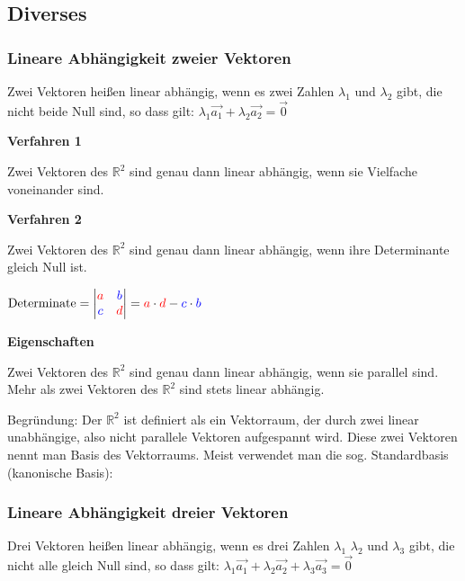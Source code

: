 \begin{multicols}{2}


    \subsection{Diverses}
    \subsubsection{Lineare Abhängigkeit zweier Vektoren}
    Zwei Vektoren heißen linear abhängig, wenn es zwei Zahlen $\lambda_1$ und $\lambda_2$ gibt, die nicht beide Null sind, so dass gilt:
    $\lambda_1\vec{a_1} + \lambda_2\vec{a_2} = \vec{0}$

    \textbf{Verfahren 1}

    Zwei Vektoren des $\mathbb{R}^2$ sind genau dann linear abhängig, wenn sie Vielfache voneinander sind.

    \textbf{Verfahren 2}

    Zwei Vektoren des $\mathbb{R}^2$ sind genau dann linear abhängig, wenn ihre Determinante gleich Null ist.

    $\text{Determinate} = \begin{vmatrix} {\color{red}a} & {\color{blue}b} \\ {\color{blue}c} & {\color{red}d} \end{vmatrix} = {\color{red}a}\cdot{\color{red}d}-{\color{blue}c}\cdot{\color{blue}b}$

    \textbf{Eigenschaften}

    Zwei Vektoren des $\mathbb{R}^2$ sind genau dann linear abhängig, wenn sie parallel sind.\\
    Mehr als zwei Vektoren des $\mathbb{R}^2$ sind stets linear abhängig.

    Begründung: Der $\mathbb{R}^2$ ist definiert als ein Vektorraum, der durch zwei linear unabhängige, also nicht parallele Vektoren aufgespannt wird. Diese zwei Vektoren nennt man Basis des Vektorraums. Meist verwendet man die sog. Standardbasis (kanonische Basis):
    \subsubsection{Lineare Abhängigkeit dreier Vektoren}

    Drei Vektoren heißen linear abhängig, wenn es drei Zahlen $\lambda_1$  $\lambda_2$ und $\lambda_3$ gibt, die nicht alle gleich Null sind, so dass gilt:
    $\lambda_1\vec{a_1} + \lambda_2\vec{a_2} + \lambda_3\vec{a_3} = \vec{0}$


\end{multicols}
